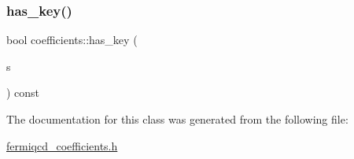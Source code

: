 \subsubsection{\texorpdfstring{has\+\_\+key()}{has\_key()}}
{\footnotesize\ttfamily bool coefficients\+::has\+\_\+key (\begin{DoxyParamCaption}\item[{const string}]{s }\end{DoxyParamCaption}) const\hspace{0.3cm}{\ttfamily [inline]}}



The documentation for this class was generated from the following file\+:\begin{DoxyCompactItemize}
\item 
\hyperlink{fermiqcd__coefficients_8h}{fermiqcd\+\_\+coefficients.\+h}\end{DoxyCompactItemize}
